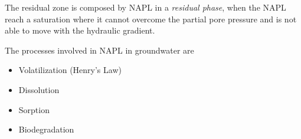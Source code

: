 \documentclass[11pt,twoside]{report}
\begin{document}
The residual zone is composed by NAPL in a \textit{residual phase}, when the NAPL reach a saturation where it cannot overcome the partial pore pressure and is not able to move with the hydraulic gradient. 

The processes involved in NAPL in groundwater are
\begin{itemize}
   \item Volatilization (Henry's Law)
   \item Dissolution
   \item Sorption
   \item Biodegradation
\end{itemize}



\end{document}
